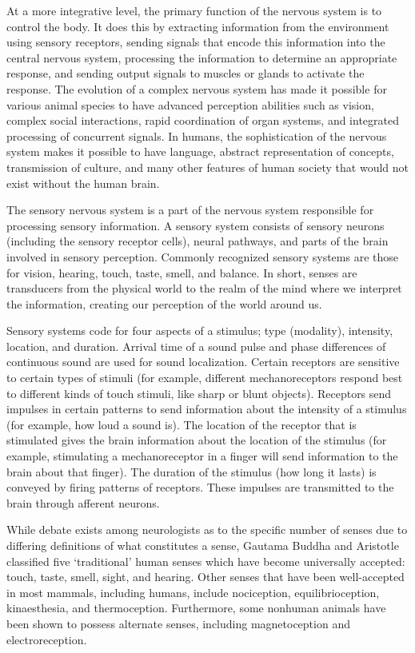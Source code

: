 \documentclass[]{book}
\begin{document}
At a more integrative level, the primary function of the nervous system is to control the body. It does this by extracting information from the environment using sensory receptors, sending signals that encode this information into the central nervous system, processing the information to determine an appropriate response, and sending output signals to muscles or glands to activate the response. The evolution of a complex nervous system has made it possible for various animal species to have advanced perception abilities such as vision, complex social interactions, rapid coordination of organ systems, and integrated processing of concurrent signals. In humans, the sophistication of the nervous system makes it possible to have language, abstract representation of concepts, transmission of culture, and many other features of human society that would not exist without the human brain.

The sensory nervous system is a part of the nervous system responsible for processing sensory information. A sensory system consists of sensory neurons (including the sensory receptor cells), neural pathways, and parts of the brain involved in sensory perception. Commonly recognized sensory systems are those for vision, hearing, touch, taste, smell, and balance. In short, senses are transducers from the physical world to the realm of the mind where we interpret the information, creating our perception of the world around us.

Sensory systems code for four aspects of a stimulus; type (modality), intensity, location, and duration. Arrival time of a sound pulse and phase differences of continuous sound are used for sound localization. Certain receptors are sensitive to certain types of stimuli (for example, different mechanoreceptors respond best to different kinds of touch stimuli, like sharp or blunt objects). Receptors send impulses in certain patterns to send information about the intensity of a stimulus (for example, how loud a sound is). The location of the receptor that is stimulated gives the brain information about the location of the stimulus (for example, stimulating a mechanoreceptor in a finger will send information to the brain about that finger). The duration of the stimulus (how long it lasts) is conveyed by firing patterns of receptors. These impulses are transmitted to the brain through afferent neurons.

While debate exists among neurologists as to the specific number of senses due to differing definitions of what constitutes a sense, Gautama Buddha and Aristotle classified five `traditional' human senses which have become universally accepted: touch, taste, smell, sight, and hearing. Other senses that have been well-accepted in most mammals, including humans, include nociception, equilibrioception, kinaesthesia, and thermoception. Furthermore, some nonhuman animals have been shown to possess alternate senses, including magnetoception and electroreception.
\end{document}
